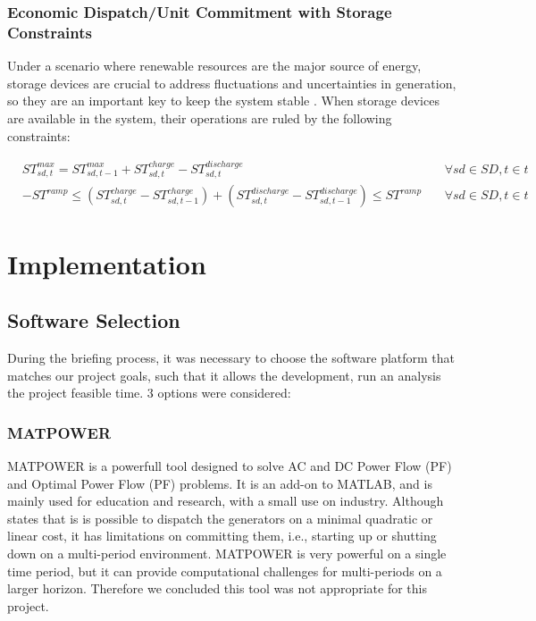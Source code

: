 \documentclass[12pt,LUDisStyle,twosided]{book}
\begin{document}
\subsubsection{Economic Dispatch/Unit Commitment with Storage Constraints}

Under a scenario where renewable resources are the major source of energy, storage devices are crucial to address fluctuations and uncertainties in generation, so they are an important key to keep the system stable \cite{dwyer}. When storage devices are available in the system, their operations are ruled by the following constraints:

\begin{subequations}\label{model:storageConstraints}
\begin{alignat}{4}
& ST^{max}_{sd,t} = ST^{max}_{sd,t - 1} + ST^{charge}_{sd,t} - ST^{discharge}_{sd,t}  &~& \forall sd \in SD, t \in t \label{eq:storageLimits} \\
&  -ST^{ramp} \leq (ST^{charge}_{sd,t} - ST^{charge}_{sd,t-1}) + (ST^{discharge}_{sd,t} - ST^{discharge}_{sd,t-1}) \leq ST^{ramp}  &~& \forall sd \in SD, t \in t \label{eq:storageRamping}
\end{alignat} 
\end{subequations}


\section{Implementation}


\subsection{Software Selection}

During the briefing process, it was necessary to choose the software platform that matches our project goals, such that it allows the development, run an analysis the project feasible time. 3 options were considered:

\subsubsection{MATPOWER}

MATPOWER is a powerfull tool designed to solve AC and DC Power Flow (PF) and Optimal Power Flow (PF) problems. It is an add-on to MATLAB, and is mainly used for education and research, with a small use on industry. \cite{zimmerman} Although \citeauthor{zimmerman} states that is is possible to dispatch the generators on a minimal quadratic or linear cost, it has limitations on committing them, i.e., starting up or shutting down on a multi-period environment. MATPOWER is very powerful on a single time period, but it can provide computational challenges for multi-periods on a larger horizon. Therefore we concluded this tool was not appropriate for this project.
\end{document}
